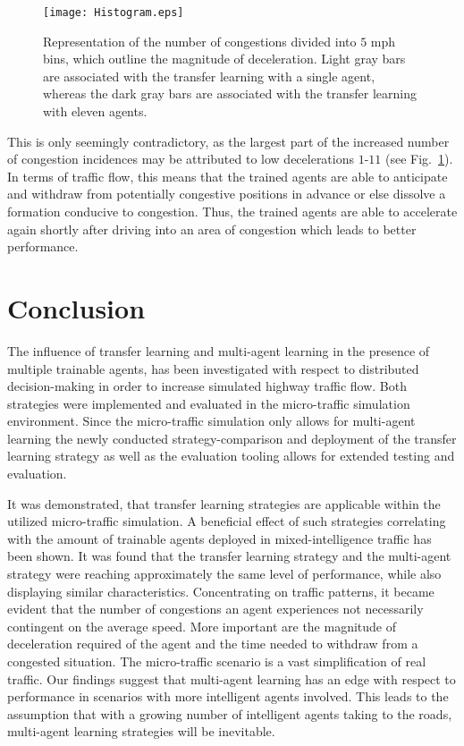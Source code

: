 \documentclass{article}
\begin{document}
\begin{figure}[ht]
	\centering
	\texttt{[image: Histogram.eps]}
	
	\caption{Representation of the number of congestions divided into $5$ mph bins, which outline the magnitude of deceleration. Light gray bars are associated with the transfer learning with a single agent, whereas the dark gray bars are associated with the transfer learning with eleven agents.}
	
	\label{fig:Histogram}
\end{figure}




This is only seemingly contradictory, as the largest part of the increased number of congestion incidences may be attributed to low decelerations $1$-$11$ (see Fig.~\ref{fig:Histogram}). In terms of traffic flow, this means that the trained agents are able to anticipate and withdraw from potentially congestive positions in advance or else dissolve a formation conducive to congestion. Thus, the trained agents are able to accelerate again shortly after driving into an area of congestion which leads to better performance.  
   










\section{Conclusion}

The influence of transfer learning and multi-agent learning in the presence of multiple trainable agents, has been investigated with respect to distributed decision-making in order to increase simulated highway traffic flow.
Both strategies were implemented and evaluated in the micro-traffic simulation environment. Since the micro-traffic simulation only allows for multi-agent learning the newly conducted strategy-comparison and deployment of the transfer learning strategy as well as the evaluation tooling allows for extended testing and evaluation.   

It was demonstrated, that transfer learning strategies are applicable within the utilized micro-traffic simulation. A beneficial effect of such strategies correlating with the amount of trainable agents deployed in mixed-intelligence traffic has been shown. It was found that the transfer learning strategy and the multi-agent strategy were reaching approximately the same level of performance, while also displaying similar characteristics. Concentrating on traffic patterns, it became evident that the number of congestions an agent experiences not necessarily contingent on the average speed. More important are the magnitude of deceleration required of the agent and the time needed to withdraw from a congested situation. The micro-traffic scenario is a vast simplification of real traffic. Our findings suggest that multi-agent learning has an edge with respect to performance in scenarios with more intelligent agents involved. This leads to the assumption that with a growing number of intelligent agents taking to the roads, multi-agent learning strategies will be inevitable.       
\end{document}
